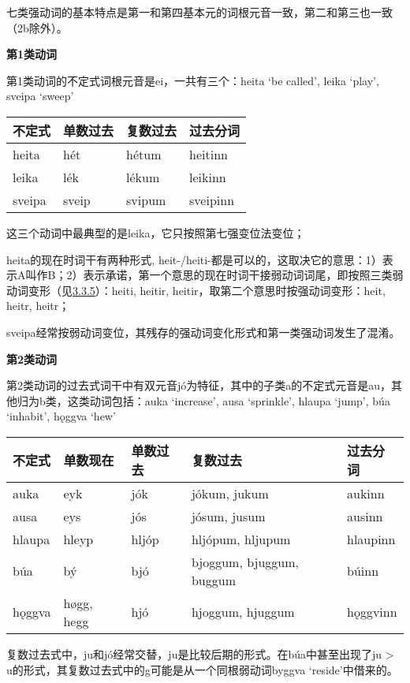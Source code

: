 七类强动词的基本特点是第一和第四基本元的词根元音一致，第二和第三也一致（2b除外）。

\textbf{第1类动词}

第1类动词的不定式词根元音是ei，一共有三个：heita `be called', leika
`play', sveipa `sweep'

\begin{longtable}{llll}
\toprule
不定式 & 单数过去 & 复数过去 & 过去分词 \\
\midrule
\endhead
\bottomrule
\endfoot
heita & hét & hétum & heitinn \\
leika & lék & lékum & leikinn \\
sveipa & sveip & svipum & sveipinn \\
\end{longtable}

这三个动词中最典型的是leika，它只按照第七强变位法变位；

heita的现在时词干有两种形式,
heit-/heiti-都是可以的，这取决它的意思：1）表示A叫作B；2）表示承诺，第一个意思的现在时词干接弱动词词尾，即按照三类弱动词变形（见\hyperref[ux7b2cux4e09ux5f31ux53d8ux4f4dux6cd5]{3.3.5}）：heiti,
heitir, heitir，取第二个意思时按强动词变形：heit, heitr, heitr；

sveipa经常按弱动词变位，其残存的强动词变化形式和第一类强动词发生了混淆。

\textbf{第2类动词}

第2类动词的过去式词干中有双元音jó为特征，其中的子类a的不定式元音是au，其他归为b类，这类动词包括：auka
`increase', ausa `sprinkle', hlaupa `jump', búa `inhabit', hǫggva `hew‌'

\begin{longtable}{lllll}
\toprule
不定式 & 单数现在 & 单数过去 & 复数过去 & 过去分词 \\
\midrule
\endhead
\bottomrule
\endfoot
auka & eyk & jók & jókum, jukum & aukinn \\
ausa & eys & jós & jósum, jusum & ausinn \\
hlaupa & hleyp & hljóp & hljópum, hljupum & hlaupinn \\
búa & bý & bjó & bjoggum, bjuggum, buggum & búinn \\
hǫggva & høgg, hegg & hjó & hjoggum, hjuggum & hǫggvinn \\
\end{longtable}

复数过去式中，ju和jó经常交替，ju是比较后期的形式。在búa中甚至出现了ju
\textgreater{} u的形式，其复数过去式中的g可能是从一个同根弱动词byggva
`reside'中借来的。

